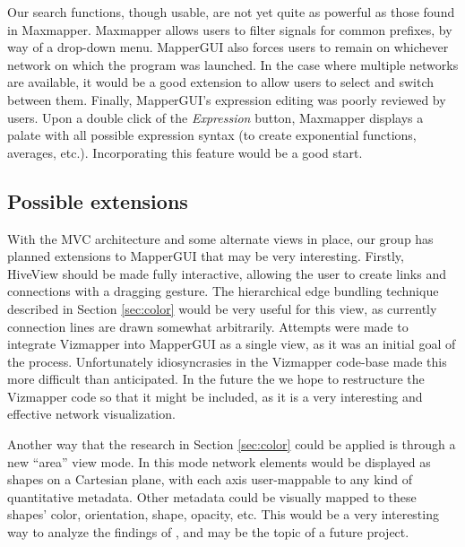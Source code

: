 Our search functions, though usable, are not yet quite as powerful as those found in Maxmapper. Maxmapper allows users to filter signals for common prefixes, by way of a drop-down menu.  MapperGUI also forces users to remain on whichever network on which the program was launched. In the case where multiple networks are available, it would be a good extension to allow users to select and switch between them. Finally, MapperGUI's expression editing was poorly reviewed by users. Upon a double click of the \emph{Expression} button, Maxmapper displays a palate with all possible expression syntax (to create exponential functions, averages, etc.). Incorporating this feature would be a good start.


	\subsection{Possible extensions} %
	\label{sub:possible_extensions}

With the MVC architecture and some alternate views in place, our group has planned extensions to MapperGUI that may be very interesting. Firstly, HiveView should be made fully interactive, allowing the user to create links and connections with a dragging gesture. The hierarchical edge bundling technique described in Section \ref{sec:color} would be very useful for this view, as currently connection lines are drawn somewhat arbitrarily. Attempts were made to integrate Vizmapper into MapperGUI as a single view, as it was an initial goal of the process. Unfortunately idiosyncrasies in the Vizmapper code-base made this more difficult than anticipated. In the future the we hope to restructure the Vizmapper code so that it might be included, as it is a very interesting and effective network visualization. 

Another way that the research in Section \ref{sec:color} could be applied is through a new ``area'' view mode. In this mode network elements would be displayed as shapes on a Cartesian plane, with each axis user-mappable to any kind of quantitative metadata. Other metadata could be visually mapped to these shapes' color, orientation, shape, opacity, etc. This would be a very interesting way to analyze the findings of , and may be the topic of a future project. 

